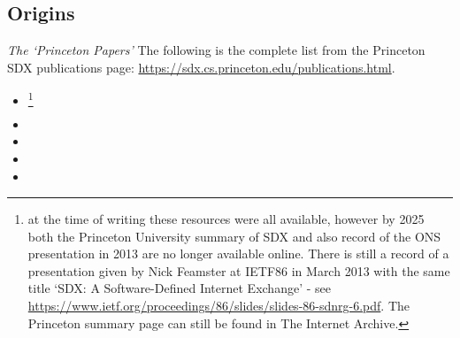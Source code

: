 \subsection{Origins}
\emph{The `Princeton Papers'}
The following is the complete list from the Princeton SDX publications page: \url{https://sdx.cs.princeton.edu/publications.html}.

\begin{itemize}
    \item {}
    
    \footnote{at the time of writing these resources were all available, however by 2025 both the Princeton University summary of SDX and also record of the ONS presentation in 2013 are no longer available online.  There is still a record of a presentation given by Nick Feamster at IETF86 in March 2013 with the same title `SDX: A Software-Defined	Internet Exchange' - see \url{https://www.ietf.org/proceedings/86/slides/slides-86-sdnrg-6.pdf}.  The Princeton summary page can still be found in The Internet Archive.}
  
    \item {}
    \item {}
    \item {}
    \item {}
\end{itemize}




